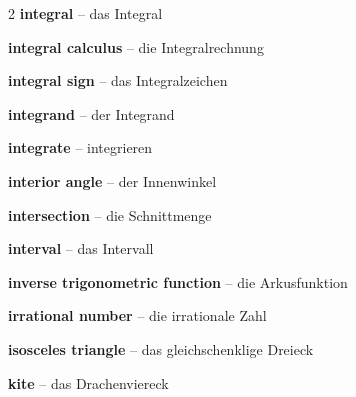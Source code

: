 \begin{multicols}{2}
\textbf{integral} -- das Integral\dotfill\hyperref[e:295]{\pageref*{e:295}}\par
\textbf{integral calculus} -- die Integralrechnung\dotfill\hyperref[e:286]{\pageref*{e:286}}\par
\textbf{integral sign} -- das Integralzeichen\dotfill\hyperref[e:289]{\pageref*{e:289}}\par
\textbf{integrand} -- der Integrand\dotfill\hyperref[e:290]{\pageref*{e:290}}\par
\textbf{integrate} -- integrieren\dotfill\hyperref[e:296]{\pageref*{e:296}}\par
\textbf{interior angle} -- der Innenwinkel\dotfill\hyperref[e:178]{\pageref*{e:178}}\par
\textbf{intersection} -- die Schnittmenge\dotfill\hyperref[e:100]{\pageref*{e:100}}\par
\textbf{interval} -- das Intervall\dotfill\hyperref[e:270]{\pageref*{e:270}}\par
\textbf{inverse trigonometric function} -- die Arkusfunktion\dotfill\hyperref[e:136]{\pageref*{e:136}}\par
\textbf{irrational number} -- die irrationale Zahl\dotfill\hyperref[e:9]{\pageref*{e:9}}\par
\textbf{isosceles triangle} -- das gleichschenklige Dreieck\dotfill\hyperref[e:182]{\pageref*{e:182}}\par

\par\nopagebreak
\textbf{kite} -- das Drachenviereck\dotfill\hyperref[e:203]{\pageref*{e:203}}\par


\end{multicols}
